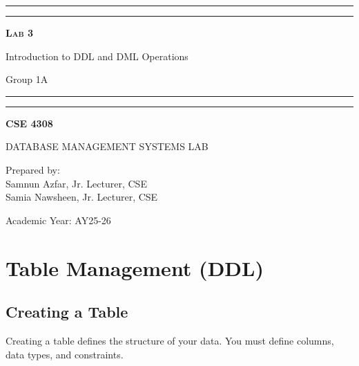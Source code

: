 \documentclass[12pt,a4paper]{article}
\begin{document}
\begin{titlepage}
    \centering
    \vspace*{2\baselineskip}

    \rule{14cm}{2pt}\vspace*{-0.8\baselineskip}\vspace*{1.5pt}
    \rule{14cm}{0.5pt}\vspace{2\baselineskip}

    {\Huge\bfseries\scshape Lab 3\par}
    \vspace{3mm}
    {\Large Introduction to DDL and DML Operations\par}
    \vspace{2mm}
    {\large Group 1A\par}
    \vspace{3mm}

    \rule{14cm}{0.5pt}\vspace*{-0.7\baselineskip}\vspace{2.5pt}
    \rule{14cm}{2pt}

    \vspace{2\baselineskip}

    {\Large\bfseries CSE 4308\par}
    \vspace{1\baselineskip}
    {\large DATABASE MANAGEMENT SYSTEMS LAB\par}

    \vfill
    {\normalsize Prepared by:\\ Samnun Azfar, Jr. Lecturer, CSE\\ Samia Nawsheen, Jr. Lecturer, CSE\par}
    {\normalsize Academic Year: AY25-26\par}
\end{titlepage}

\newpage

\section{Table Management (DDL)}

\subsection{Creating a Table}
Creating a table defines the structure of your data. You must define columns, data types, and constraints.
\end{document}
